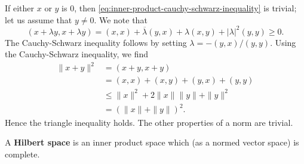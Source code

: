 \begin{Proof}
If either $x$ or $y$ is 0, then \eqref{eq:inner-product-cauchy-schwarz-inequality} is trivial; let us assume that $y\ne0$. We note that
\begin{equation}\label{eq:cauchy-schwarz-positive-quadratic-form}
(x+\lambda y,x+\lambda y)=(x,x)+\overline\lambda(y,x)+\lambda(x,y)+|\lambda|^2(y,y)\geq0.
\end{equation}
The Cauchy-Schwarz inequality follows by setting $\lambda=-(y,x)/(y,y)$. Using the Cauchy-Schwarz inequality, we find
\begin{equation}\label{eq:inner-product-norm-triangle-calculation}
\begin{aligned}
\|x+y\|^2&=(x+y,x+y)\\
&=(x,x)+(x,y)+(y,x)+(y,y)\\
&\leq\|x\|^2+2\|x\|\|y\|+\|y\|^2\\
&=(\|x\|+\|y\|)^2.
\end{aligned}
\end{equation}
Hence the triangle inequality holds. The other properties of a norm are trivial.
\end{Proof}

\begin{Definition}
\label{def:hilbert-space}
A \textbf{Hilbert space} is an inner product space which (as a normed vector space) is complete.
\end{Definition}
